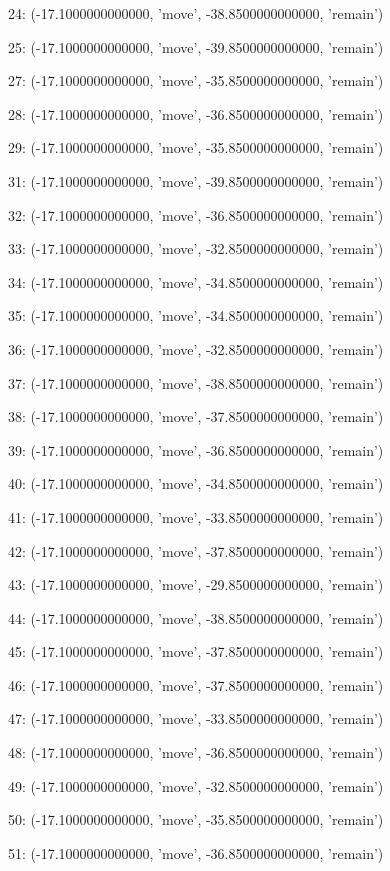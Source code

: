 24: (-17.1000000000000, 'move', -38.8500000000000, 'remain')


25: (-17.1000000000000, 'move', -39.8500000000000, 'remain')


27: (-17.1000000000000, 'move', -35.8500000000000, 'remain')


28: (-17.1000000000000, 'move', -36.8500000000000, 'remain')


29: (-17.1000000000000, 'move', -35.8500000000000, 'remain')


31: (-17.1000000000000, 'move', -39.8500000000000, 'remain')


32: (-17.1000000000000, 'move', -36.8500000000000, 'remain')


33: (-17.1000000000000, 'move', -32.8500000000000, 'remain')


34: (-17.1000000000000, 'move', -34.8500000000000, 'remain')


35: (-17.1000000000000, 'move', -34.8500000000000, 'remain')


36: (-17.1000000000000, 'move', -32.8500000000000, 'remain')


37: (-17.1000000000000, 'move', -38.8500000000000, 'remain')


38: (-17.1000000000000, 'move', -37.8500000000000, 'remain')


39: (-17.1000000000000, 'move', -36.8500000000000, 'remain')


40: (-17.1000000000000, 'move', -34.8500000000000, 'remain')


41: (-17.1000000000000, 'move', -33.8500000000000, 'remain')


42: (-17.1000000000000, 'move', -37.8500000000000, 'remain')


43: (-17.1000000000000, 'move', -29.8500000000000, 'remain')


44: (-17.1000000000000, 'move', -38.8500000000000, 'remain')


45: (-17.1000000000000, 'move', -37.8500000000000, 'remain')


46: (-17.1000000000000, 'move', -37.8500000000000, 'remain')


47: (-17.1000000000000, 'move', -33.8500000000000, 'remain')


48: (-17.1000000000000, 'move', -36.8500000000000, 'remain')


49: (-17.1000000000000, 'move', -32.8500000000000, 'remain')


50: (-17.1000000000000, 'move', -35.8500000000000, 'remain')


51: (-17.1000000000000, 'move', -36.8500000000000, 'remain')


